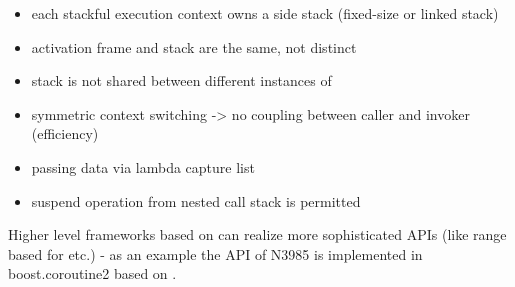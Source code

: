 \begin{itemize}
    \item   each stackful execution context owns a side stack (fixed-size or
            linked stack)
    \item   activation frame and stack are the same, not distinct
    \item   stack is not shared between different instances of \ectx
    \item   symmetric context switching -> no coupling between caller and
            invoker (efficiency)
    \item   passing data via lambda capture list
    \item   suspend operation from nested call stack is permitted
\end{itemize}
Higher level frameworks based on \ectx can realize more sophisticated APIs
(like range based for etc.) - as an example the API of N3985\cite{N3985} is
implemented in boost.coroutine2\cite{bcoroutine2} based on
.
